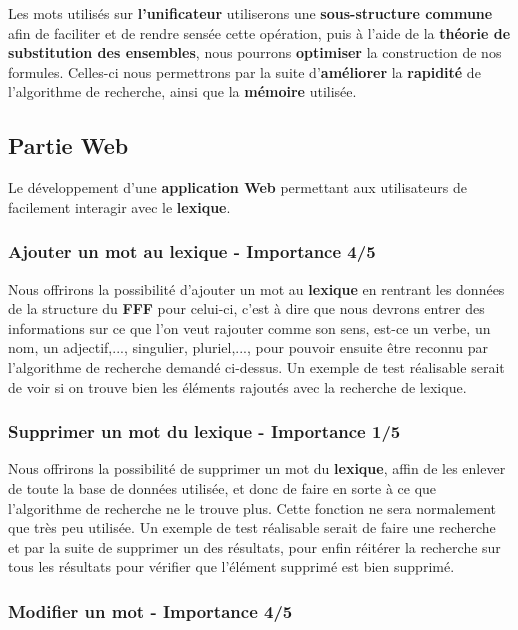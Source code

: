 {Les mots utilisés sur \textbf{l'unificateur} utiliserons une \textbf{sous-structure commune} afin de faciliter et de rendre sensée cette opération, puis à l'aide de la \textbf{théorie de substitution des ensembles}, nous pourrons \textbf{optimiser} la construction de nos formules. Celles-ci nous permettrons par la suite d'\textbf{améliorer} la \textbf{rapidité} de l'algorithme de recherche, ainsi que la \textbf{mémoire} utilisée.\par}


\subsection{Partie Web}
Le développement d'une \textbf{application Web} permettant aux utilisateurs de facilement interagir avec le \textbf{lexique}.

\subsubsection{Ajouter un mot au lexique - Importance 4/5}

{Nous offrirons la possibilité d'ajouter un mot au \textbf{lexique} en rentrant les données de la structure du \textbf{FFF} pour celui-ci, c'est à dire que nous devrons entrer des informations sur ce que l'on veut rajouter comme son sens, est-ce un verbe, un nom, un adjectif,..., singulier, pluriel,..., pour pouvoir ensuite être reconnu par l'algorithme de recherche demandé ci-dessus. Un exemple de test réalisable serait de voir si on trouve bien les éléments rajoutés avec la recherche de lexique.\par}

\subsubsection{Supprimer un mot du lexique - Importance 1/5}
{Nous offrirons la possibilité de supprimer un mot du \textbf{lexique}, affin de les enlever de toute la base de données utilisée, et donc de faire en sorte à ce que l'algorithme de recherche ne le trouve plus. Cette fonction ne sera normalement que très peu utilisée. Un exemple de test réalisable serait de faire une recherche et par la suite de supprimer un des résultats, pour enfin réitérer la recherche sur tous les résultats pour vérifier que l'élément supprimé est bien supprimé.\par}

\subsubsection{Modifier un mot - Importance 4/5}
 
